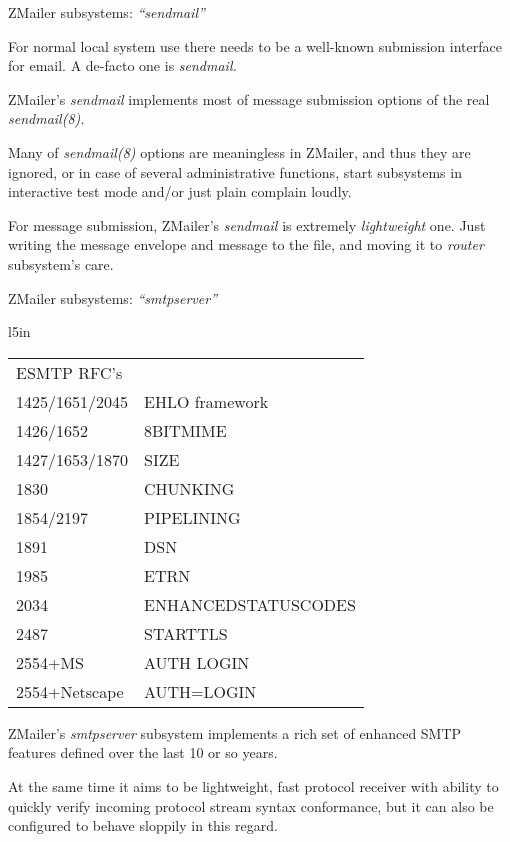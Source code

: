 \documentclass[a4paper,landscape]{slides}
\newcommand{\ZM}{ZMailer}
\begin{document}
\begin{slide}

\centerline{\large \ZM{} subsystems: {\it ``sendmail''}}

For normal local system use there needs to be a well-known
submission interface for email.  A de-facto one is {\it sendmail.}

\ZM's {\it sendmail} implements most of message submission options
of the real {\it sendmail(8).}

Many of {\it sendmail(8)} options are meaningless in \ZM{}, and thus
they are ignored, or in case of several administrative functions,
start subsystems in interactive test mode and/or just plain complain
loudly.

For message submission, \ZM's {\it sendmail} is extremely
{\it lightweight} one.  Just writing the message envelope and
message to the file, and moving it to {\it router} subsystem's care.



\vfill

\end{slide}



\begin{slide}

\centerline{\large \ZM{} subsystems: {\it ``smtpserver''}}

\begin{wrapfigure}{l}{5in}
\tiny
\begin{tabular}{ll}
ESMTP RFC's \\
1425/1651/2045 & EHLO framework \\
1426/1652 & 8BITMIME \\
1427/1653/1870 & SIZE \\
1830 & CHUNKING \\
1854/2197 & PIPELINING \\
1891 & DSN \\
1985 & ETRN \\
2034 & ENHANCEDSTATUSCODES \\
2487 & STARTTLS \\
2554+MS & AUTH LOGIN \\
2554+Netscape & AUTH=LOGIN
\end{tabular}
\end{wrapfigure}
\ZM's {\it smtpserver} subsystem implements a rich set of enhanced SMTP
features defined over the last 10 or so years.

At the same time it aims to be lightweight, fast protocol receiver with
ability to quickly verify incoming protocol stream syntax conformance,
but it can also be configured to behave sloppily in this regard.

\vfill

\end{slide}
\end{document}
